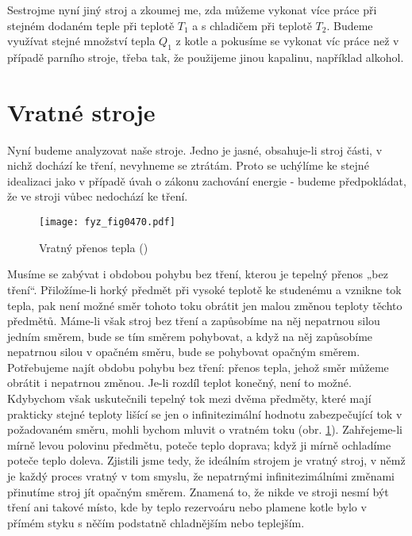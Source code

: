     Sestrojme nyní jiný stroj a zkoumej me, zda můžeme vykonat více práce při stejném dodaném teple
    při teplotě \(T_1\) a s chladičem při teplotě \(T_2\). Budeme využívat stejné množství tepla
    \(Q_1\) z kotle a pokusíme se vykonat víc práce než v případě parního stroje, třeba tak, že
    použijeme jinou kapalinu, například alkohol.

  \section{Vratné stroje}\label{fyz:IchapXLIVsecIII}
    Nyní budeme analyzovat naše stroje. Jedno je jasné, obsahuje-li stroj části, v nichž dochází ke
    tření, nevyhneme se ztrátám. Proto se uchýlíme ke stejné idealizaci jako v případě úvah o zákonu
    zachování energie - budeme předpokládat, že ve stroji vůbec nedochází ke tření.
  
    \begin{figure}[ht!] %
      \centering
      \texttt{[image: fyz\_fig0470.pdf]}
      \caption{Vratný přenos tepla (\cite[s.~707]{Feynman01})}
      \label{fyz:fig0470}
    \end{figure}

    Musíme se zabývat i obdobou pohybu bez tření, kterou je tepelný přenos „bez tření“. Přiložíme-li
    horký předmět při vysoké teplotě ke studenému a vznikne tok tepla, pak není možné směr tohoto
    toku obrátit jen malou změnou teploty těchto předmětů. Máme-li však stroj bez tření a zapůsobíme
    na něj nepatrnou silou jedním směrem, bude se tím směrem pohybovat, a když na něj zapůsobíme
    nepatrnou silou v opačném směru, bude se pohybovat opačným směrem. Potřebujeme najít obdobu
    pohybu bez tření: přenos tepla, jehož směr můžeme obrátit i nepatrnou změnou. Je-li rozdíl
    teplot konečný, není to možné. Kdybychom však uskutečnili tepelný tok mezi dvěma předměty, které
    mají prakticky stejné teploty lišící se jen o inﬁnitezimální hodnotu zabezpečující tok v
    požadovaném směru, mohli bychom mluvit o vratném toku (obr. \ref{fyz:fig0470}). Zahřejeme-li
    mírně levou polovinu předmětu, poteče teplo doprava; když ji mírně ochladíme poteče teplo
    doleva. Zjistili jsme tedy, že ideálním strojem je vratný stroj, v němž je každý proces vratný v
    tom smyslu, že nepatrnými inﬁnitezimálními změnami přinutíme stroj jít opačným směrem. Znamená
    to, že nikde ve stroji nesmí být tření ani takové místo, kde by teplo rezervoáru nebo plamene
    kotle bylo v přímém styku s něčím podstatně chladnějším nebo teplejším.

